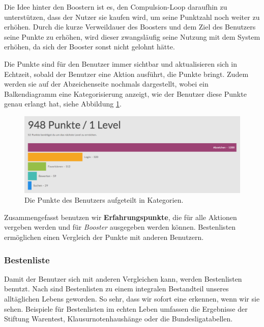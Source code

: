 \documentclass[12pt,twoside]{book}
\begin{document}
Die Idee hinter den Boostern ist es, den Compulsion-Loop daraufhin zu unterstützen, dass der Nutzer sie kaufen wird, um seine Punktzahl noch weiter zu erhöhen. Durch die kurze Verweildauer des Boosters und dem Ziel des Benutzers seine Punkte zu erhöhen, wird dieser zwangsläufig seine Nutzung mit dem System erhöhen, da sich der Booster sonst nicht gelohnt hätte.

Die Punkte sind für den Benutzer immer sichtbar und aktualisieren sich in Echtzeit, sobald der Benutzer eine Aktion ausführt, die Punkte bringt. Zudem werden sie auf der Abzeichenseite nochmals dargestellt, wobei ein Balkendiagramm eine Kategorisierung anzeigt, wie der Benutzer diese Punkte genau erlangt hat, siehe Abbildung \ref{fig:points}.

\begin{figure}[htbp]
    \centering
    \includegraphics[width=1.0\textwidth]{images/infoboard_userstats.png}
    \caption{Die Punkte des Benutzers aufgeteilt in Kategorien.}
    \label{fig:points}
\end{figure}

Zusammengefasst benutzen wir \textbf{Erfahrungspunkte}, die für alle Aktionen vergeben werden und für \textit{Booster} ausgegeben werden können. Bestenlisten ermöglichen einen Vergleich der Punkte mit anderen Benutzern.

\subsubsection*{Bestenliste}

Damit der Benutzer sich mit anderen Vergleichen kann, werden Bestenlisten benutzt. Nach \citep[pp. 49 - 50]{zichermann2011gamification} sind Bestenlisten zu einem integralen Bestandteil unseres alltäglichen Lebens geworden. So sehr, dass wir sofort eine erkennen, wenn wir sie sehen. Beispiele für Bestenlisten im echten Leben umfassen die Ergebnisse der Stiftung Warentest, Klausurnotenhaushänge oder die Bundesligatabellen.
\end{document}
